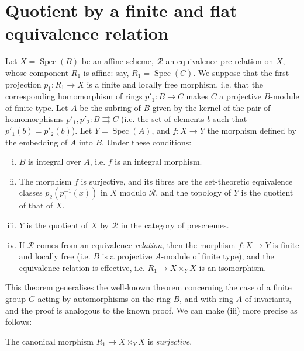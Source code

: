 \section{Quotient by a finite and flat equivalence relation}\label{fga3.iii-5}

\begin{theorem}\label{fga3.iii-5-theorem-5.1}
    Let $X=\operatorname{Spec}(B)$ be an affine scheme, $\mathcal{R}$ an equivalence pre-relation on $X$, whose component $R_1$ is affine: say, $R_1=\operatorname{Spec}(C)$.
    We suppose that the first projection $p_1\colon R_1\to X$ is a finite and locally free morphism, i.e. that the corresponding homomorphism of rings $p'_1\colon B\to C$ makes $C$ a projective $B$-module of finite type.
    Let $A$ be the subring of $B$ given by the kernel of the pair of homomorphisms $p'_1,p'_2\colon B\rightrightarrows C$ (i.e. the set of elements $b$ such that $p'_1(b)=p'_2(b)$).
    Let $Y=\operatorname{Spec}(A)$, and $f\colon X\to Y$ the morphism defined by the embedding of $A$ into $B$.
    Under these conditions:

    \begin{enumerate}[i.]
        \item $B$ is integral over $A$, i.e. $f$ is an integral morphism.
        \item The morphism $f$ is surjective, and its fibres are the set-theoretic equivalence classes $p_2(p_1^{-1}(x))$ in $X$ modulo $\mathcal{R}$, and the topology of $Y$ is the quotient of that of $X$.
        \item $Y$ is the quotient of $X$ by $\mathcal{R}$ in the category of preschemes.
        \item If $\mathcal{R}$ comes from an equivalence \emph{relation}, then the morphism $f\colon X\to Y$ is finite and locally free (i.e. $B$ is a projective $A$-module of finite type), and the equivalence relation is effective, i.e. $R_1\to X\times_Y X$ is an isomorphism.
    \end{enumerate}
\end{theorem}



This theorem generalises the well-known theorem concerning the case of a finite group $G$ acting by automorphisms on the ring $B$, and with ring $A$ of invariants, and the proof is analogous to the known proof.
We can make (iii) more precise as follows:


\begin{corollary}\label{fga3.iii-5-corollary-5.2}
    The canonical morphism $R_1\to X\times_Y X$ is \emph{surjective}.
\end{corollary}


